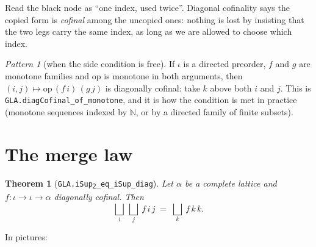 \documentclass[11pt,a4paper]{article}
\newcommand{\lean}[1]{\texttt{\small #1}}
\theoremstyle{definition}
\theoremstyle{plain}
\newtheorem{theorem}[definition]{Theorem}
\theoremstyle{remark}
\newtheorem{pattern}{Pattern}
\begin{document}
\noindent
Read the black node as ``one index, used twice''. Diagonal cofinality says the
copied form is \emph{cofinal} among the uncopied ones: nothing is lost by
insisting that the two legs carry the same index, as long as we are allowed to
choose which index.

\begin{pattern}[when the side condition is free]
If $\iota$ is a directed preorder, $f$ and $g$ are monotone families and
$\mathrm{op}$ is monotone in both arguments, then
$(i,j)\mapsto \mathrm{op}\,(f\,i)\,(g\,j)$ is diagonally cofinal: take $k$
above both $i$ and $j$. This is \lean{GLA.diagCofinal\_of\_monotone}, and it
is how the condition is met in practice (monotone sequences indexed by
$\mathbb{N}$, or by a directed family of finite subsets).
\end{pattern}

\section{The merge law}

\begin{theorem}[\lean{GLA.iSup\textsubscript{2}\_eq\_iSup\_diag}]\label{thm:merge}
Let $\alpha$ be a complete lattice and $f:\iota\to\iota\to\alpha$ diagonally
cofinal. Then
\[
\bigsqcup_i\ \bigsqcup_j\ f\,i\,j \;=\; \bigsqcup_k\ f\,k\,k .
\]
\end{theorem}

\noindent In pictures:

\begin{center}
\end{center}
\end{document}
